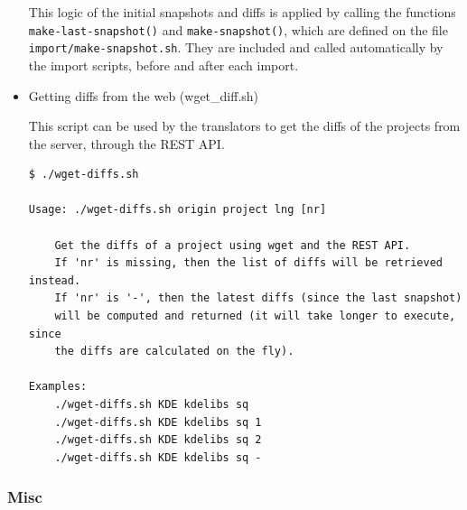 \documentclass[11pt]{article}
\begin{document}
\begin{itemize}
     This logic of the initial snapshots and diffs is applied by calling
     the functions \texttt{make-last-snapshot()} and \texttt{make-snapshot()}, which
     are defined on the file \texttt{import/make-snapshot.sh}. They are
     included and called automatically by the import scripts, before and
     after each import.


\item Getting diffs from the web (wget\_{}diff.sh)\\
\label{sec-8.4.4.6}


     This script can be used by the translators to get the diffs of the
     projects from the server, through the REST API.


\begin{verbatim}
$ ./wget-diffs.sh

Usage: ./wget-diffs.sh origin project lng [nr]

    Get the diffs of a project using wget and the REST API.
    If 'nr' is missing, then the list of diffs will be retrieved instead.
    If 'nr' is '-', then the latest diffs (since the last snapshot)
    will be computed and returned (it will take longer to execute, since
    the diffs are calculated on the fly). 

Examples:
    ./wget-diffs.sh KDE kdelibs sq
    ./wget-diffs.sh KDE kdelibs sq 1
    ./wget-diffs.sh KDE kdelibs sq 2
    ./wget-diffs.sh KDE kdelibs sq -
\end{verbatim}




\end{itemize} %
\subsubsection{Misc}
\label{sec-8.4.5}
\end{document}
